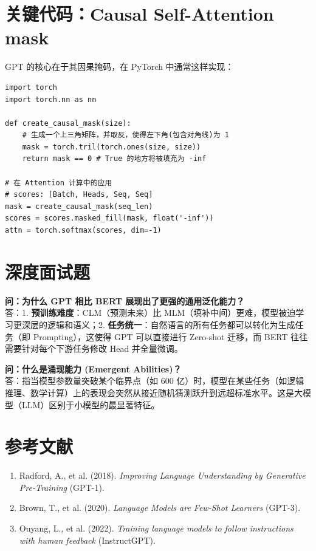 \documentclass[12pt, a4paper]{article}
\begin{document}
\section{关键代码：Causal Self-Attention mask}
GPT 的核心在于其因果掩码，在 PyTorch 中通常这样实现：
\begin{lstlisting}
import torch
import torch.nn as nn

def create_causal_mask(size):
    # 生成一个上三角矩阵，并取反，使得左下角(包含对角线)为 1
    mask = torch.tril(torch.ones(size, size))
    return mask == 0 # True 的地方将被填充为 -inf

# 在 Attention 计算中的应用
# scores: [Batch, Heads, Seq, Seq]
mask = create_causal_mask(seq_len)
scores = scores.masked_fill(mask, float('-inf'))
attn = torch.softmax(scores, dim=-1)
\end{lstlisting}

\section{深度面试题}

\textbf{问：为什么 GPT 相比 BERT 展现出了更强的通用泛化能力？}\\
答：1. \textbf{预训练难度}：CLM（预测未来）比 MLM（填补中间）更难，模型被迫学习更深层的逻辑和语义；2. \textbf{任务统一}：自然语言的所有任务都可以转化为生成任务（即 Prompting），这使得 GPT 可以直接进行 Zero-shot 迁移，而 BERT 往往需要针对每个下游任务修改 Head 并全量微调。

\textbf{问：什么是涌现能力 (Emergent Abilities)？}\\
答：指当模型参数量突破某个临界点（如 600 亿）时，模型在某些任务（如逻辑推理、数学计算）上的表现会突然从接近随机猜测跃升到远超标准水平。这是大模型（LLM）区别于小模型的最显著特征。

\section{参考文献}
\begin{enumerate}
    \item Radford, A., et al. (2018). \textit{Improving Language Understanding by Generative Pre-Training} (GPT-1).
    \item Brown, T., et al. (2020). \textit{Language Models are Few-Shot Learners} (GPT-3).
    \item Ouyang, L., et al. (2022). \textit{Training language models to follow instructions with human feedback} (InstructGPT).
\end{enumerate}
\end{document}
